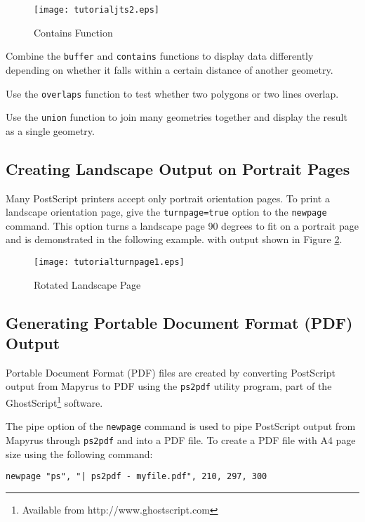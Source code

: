\begin{figure}[htb]
\texttt{[image: tutorialjts2.eps]}
\caption{Contains Function}
\label{tutorialjts2}
\end{figure}

Combine the \texttt{buffer} and \texttt{contains} functions to
display data differently depending on whether it falls within
a certain distance of another geometry.

Use the \texttt{overlaps} function to test whether two
polygons or two lines overlap.

Use the \texttt{union} function to join many geometries together
and display the result as a single geometry.

\subsection{Creating Landscape Output on Portrait Pages}

Many PostScript printers accept only portrait orientation pages.
To print a landscape orientation page, 
give the \texttt{turnpage=true} option to the \texttt{newpage} command.
This option turns a landscape page 90 degrees to fit on a portrait page
and is demonstrated in the following example.
with output shown in Figure \ref{tutorialturnpage1}.



\begin{figure}[htb]
\texttt{[image: tutorialturnpage1.eps]}
\caption{Rotated Landscape Page}
\label{tutorialturnpage1}
\end{figure}

\subsection{Generating Portable Document Format (PDF) Output}
\label{pdf}


Portable Document Format (PDF) files are created by converting PostScript
output from Mapyrus to PDF using the \texttt{ps2pdf} utility program, part of
the GhostScript\footnote{Available from http://www.ghostscript.com} software.

The pipe option of the \texttt{newpage} command is used to pipe PostScript
output from Mapyrus through \texttt{ps2pdf} and into a PDF file.  To create
a PDF file with A4 page size using the following command:

\begin{verbatim}
newpage "ps", "| ps2pdf - myfile.pdf", 210, 297, 300
\end{verbatim}

